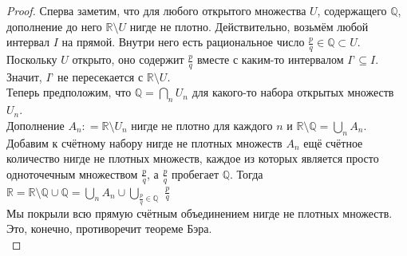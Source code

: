 \documentclass{report}
\begin{document}
\begin{proof} Сперва заметим, что для любого открытого множества $U$, содержащего $\mathbb{Q}$, дополнение до него $\mathbb{R} \setminus U$ нигде не плотно. Действительно, возьмём любой интервал $I$ на прямой. Внутри него есть рациональное число $\frac{p}{q} \in \mathbb{Q} \subset U$. Поскольку $U$ открыто, оно содержит $\frac{p}{q}$ вместе с каким-то интервалом $I’ \subseteq I$. Значит, $I’$ не пересекается с $\mathbb{R} \setminus U$. \\

Теперь предположим, что $\mathbb{Q} = \bigcap_n U_n$ для какого-то набора открытых множеств $U_n$. \\

Дополнение $A_n \colon=\mathbb{R} \setminus U_n$ нигде не плотно для каждого $n$ и $\mathbb{R} \setminus \mathbb{Q} = \bigcup_n A_n$. Добавим к счётному набору нигде не плотных множеств $A_n$ ещё счётное количество нигде не плотных множеств, каждое из которых является просто одноточечным множеством {$\frac{p}{q}$}, а $\frac{p}{q}$ пробегает $\mathbb{Q}$. Тогда 
$\mathbb{R} = \mathbb{R} \setminus \mathbb{Q} \cup \mathbb{Q} = \bigcup_n A_n \cup \bigcup_{\frac{p}{q} \in \mathbb{Q}}$ {$\frac{p}{q}$} \\

Мы покрыли всю прямую счётным объединением нигде не плотных множеств. Это, конечно, противоречит теореме Бэра.\\
\end{proof}
\end{document}
